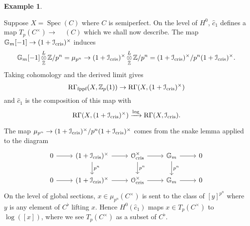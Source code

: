 \documentclass[11pt]{article}
\theoremstyle{plain}
\theoremstyle{definition}
\newtheorem{ExS}[ThmS]{Example}
\theoremstyle{remark}
\numberwithin{equation}{section}
\newenvironment{examples}[1]%
    { \begin{ExS} \label{Exx:#1}}
    { \end{ExS} }
\newcommand{\exs}[1]{\begin{examples}{#1} }
\newcommand{\eexs}{\end{examples}}
\newcommand\Z{\mathbb{Z}}
\newcommand\calO{\mathcal{O}}
\newcommand\calI{\mathcal{I}}
\DeclareMathOperator{\ten}{\otimes}
\newcommand{\Gm}{\mathbb{G}_m}
\newcommand{\Zp}{\mathbb{Z}_p}
\newcommand{\mupn}{\mu_{p^n}}                                           %
\newcommand\xto[2]{\xrightarrow[#1]{#2}}
\DeclareMathOperator{\Rgam}{\text{R}\Gamma}                              %
\DeclareMathOperator{\Spec}{Spec}                                        %
\DeclareMathOperator{\Rflat}{R\Gamma_{\textnormal{fppf}}}                %
\DeclareMathOperator{\Acr}{\mathbb{A}_{cris}}                            %
\newcommand\perf[1]{#1^{\flat}}                                          %
\newcommand\ocris{\calO_{\textnormal{cris}}}                             %
\newcommand\icris{\calI_{\textnormal{cris}}}                             %
\DeclareMathOperator{\Nyg}{F_N^1}                                      %
\begin{document}
\exs{}

Suppose $X=\Spec(C)$ where $C$ is semiperfect. On the level of $H^0$, $\hat{c}_1$ defines a map $T_p(C^{\times})\to\Nyg\Acr(C)$ which we shall now describe. The map $\Gm[-1]\to(1+\icris)^{\times}$ induces 
\[
\Gm[-1]\ten^L_{\Z}\Z/p^n=\mupn\to(1+\icris)^{\times}\ten^L_{\Z}\Z/p^n=(1+\icris)^{\times}/p^n(1+\icris)^{\times}.
\]
Taking cohomology and the derived limit gives 
\[
\Rflat(X,\Zp(1))\to\Rgam(X,(1+\icris)^{\times})\]
and $\hat{c}_1$ is the composition of this map with 
\[
\Rgam(X,(1+\icris)^{\times})\xto{}{\log}\Rgam(X,\icris).
\]

The map $\mupn\to(1+\icris)^{\times}/p^n(1+\icris)^{\times}$ comes from the snake lemma applied to the diagram
\[\begin{tikzcd}
	0 & {(1+\icris)^{\times}} & {\ocris^{\times}} & \Gm & 0 \\
	0 & {(1+\icris)^{\times}} & {\ocris^{\times}} & \Gm & 0
	\arrow[from=1-1, to=1-2]
	\arrow[from=1-2, to=1-3]
	\arrow["{p^n}", from=1-2, to=2-2]
	\arrow[from=1-3, to=1-4]
	\arrow["{p^n}", from=1-3, to=2-3]
	\arrow[from=1-4, to=1-5]
	\arrow["{p^n}", from=1-4, to=2-4]
	\arrow[from=2-1, to=2-2]
	\arrow[from=2-2, to=2-3]
	\arrow[from=2-3, to=2-4]
	\arrow[from=2-4, to=2-5]
\end{tikzcd}\]
On the level of global sections, $x\in\mupn(C^{\times})$ is sent to the class of $[y]^{p^n}$ where $y$ is any element of $\perf{C}$ lifting $x$. Hence $H^0(\hat{c}_1)$ maps $x\in T_p(C^{\times})$ to $\log([x])$, where we see $T_p(C^{\times})$ as a subset of $\perf{C}$.


\eexs
\end{document}
